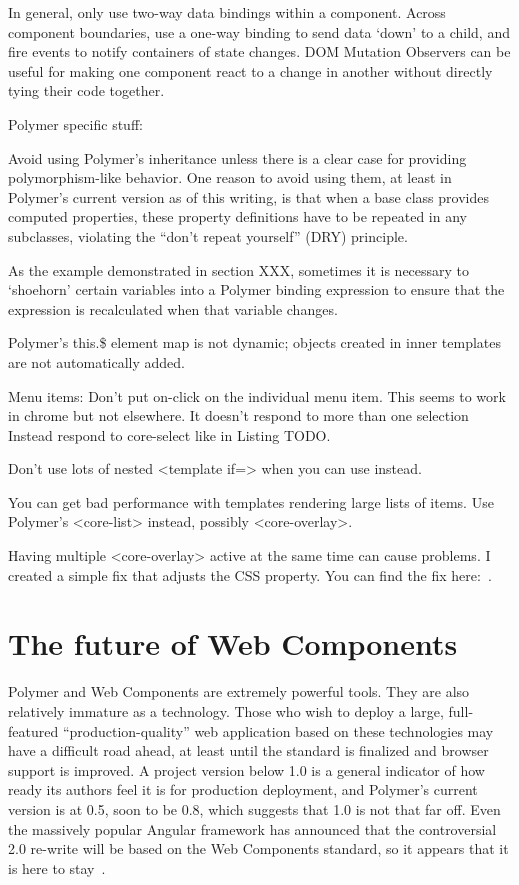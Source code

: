 In general, only use two-way data bindings within a component.
Across component boundaries, use a one-way binding to send data `down' to a child,
and fire events to notify containers of state changes.
DOM Mutation Observers can be useful for making one component react to a change in another without directly tying their code together.


Polymer specific stuff:


Avoid using Polymer's inheritance unless there is a clear case for providing polymorphism-like behavior.
One reason to avoid using them, at least in Polymer's current version as of this writing, is that when a base class provides computed properties, 
these property definitions have to be repeated in any subclasses, 
violating the ``don't repeat yourself'' (DRY) principle.

As the  example demonstrated in section XXX, 
sometimes it is necessary to `shoehorn' certain variables into a Polymer binding expression 
to ensure that the expression is recalculated when that variable changes.

Polymer's this.\$ element map is not dynamic; objects created in inner templates are not automatically added.

Menu items:
Don't put on-click on the individual menu item. This seems to work in chrome but not elsewhere. It doesn't respond to more than one selection
Instead respond to core-select like in Listing TODO.

Don't use lots of nested <template if=> when you can use  instead.

You can get bad performance with templates rendering large lists of items. Use Polymer's <core-list> instead, possibly <core-overlay>.

Having multiple <core-overlay> active at the same time can cause problems. I created a simple fix that adjusts the CSS  property. 
You can find the fix here:~\cite{landers2015-d}.


\section{The future of Web Components}

Polymer and Web Components are extremely powerful tools.
They are also relatively immature as a technology.
Those who wish to deploy a large, full-featured ``prod\-uction-quality'' web application based on these technologies may have a difficult road ahead, 
at least until the standard is finalized and browser support is improved.
A project version below 1.0 is a general indicator of how ready its authors feel it is for production deployment, and Polymer's current version is at 0.5, soon to be 0.8, 
which suggests that 1.0 is not that far off.
Even the massively popular Angular framework has announced that the controversial 2.0 re-write will be based on the Web Components standard,
so it appears that it is here to stay~\cite{santiagoesteva2015}.

